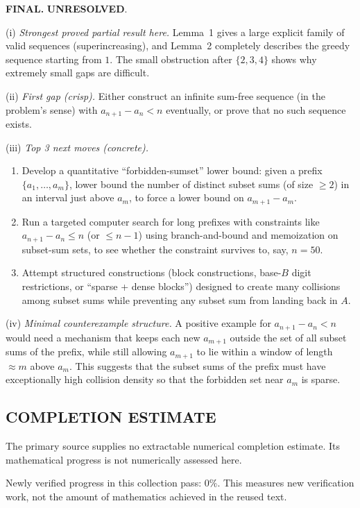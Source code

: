 \medskip
\noindent\textbf{FINAL.} \textbf{UNRESOLVED}.

\noindent(i) \emph{Strongest proved partial result here.}
Lemma~1 gives a large explicit family of valid sequences (superincreasing), and Lemma~2 completely describes the greedy sequence starting from $1$.
The small obstruction after $\{2,3,4\}$ shows why extremely small gaps are difficult.

\noindent(ii) \emph{First gap (crisp).}
Either construct an infinite sum-free sequence (in the problem's sense) with $a_{n+1}-a_n<n$ eventually, or prove that no such sequence exists.

\noindent(iii) \emph{Top 3 next moves (concrete).}
\begin{enumerate}
\item Develop a quantitative ``forbidden-sumset'' lower bound: given a prefix $\{a_1,\dots,a_m\}$, lower bound the number of distinct subset sums (of size $\ge 2$) in an interval just above $a_m$, to force a lower bound on $a_{m+1}-a_m$.
\item Run a targeted computer search for long prefixes with constraints like $a_{n+1}-a_n\le n$ (or $\le n-1$) using branch-and-bound and memoization on subset-sum sets, to see whether the constraint survives to, say, $n=50$.
\item Attempt structured constructions (block constructions, base-$B$ digit restrictions, or ``sparse + dense blocks'') designed to create many collisions among subset sums while preventing any subset sum from landing back in $A$.
\end{enumerate}

\noindent(iv) \emph{Minimal counterexample structure.}
A positive example for $a_{n+1}-a_n<n$ would need a mechanism that keeps each new $a_{m+1}$ outside the set of all subset sums of the prefix, while still allowing $a_{m+1}$ to lie within a window of length $\approx m$ above $a_m$. This suggests that the subset sums of the prefix must have exceptionally high collision density so that the forbidden set near $a_m$ is sparse.




\subsection*{COMPLETION ESTIMATE}
The primary source supplies no extractable numerical completion estimate. Its mathematical progress is not numerically assessed here.

Newly verified progress in this collection pass: $0\%$. This measures new verification work, not the amount of mathematics achieved in the reused text.
